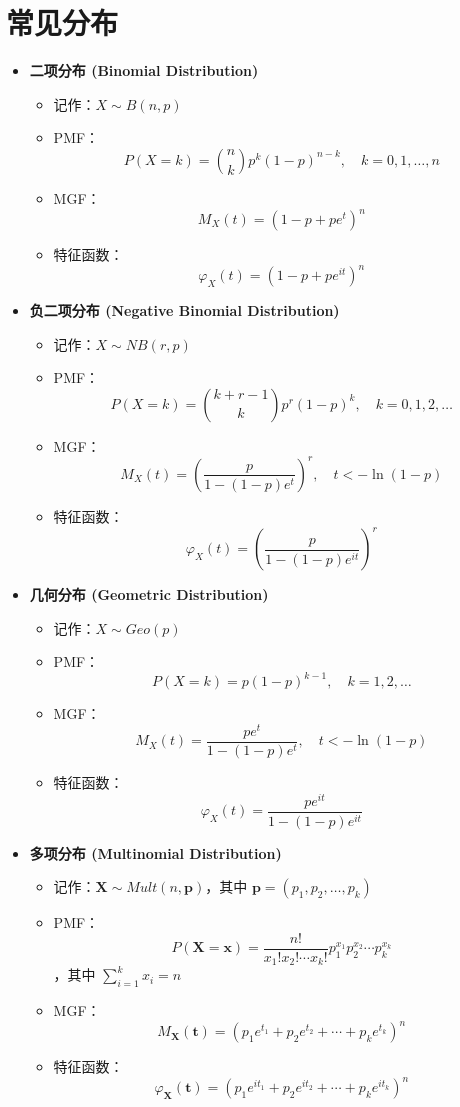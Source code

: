 \section{常见分布}

\begin{itemize}
    \item \textbf{二项分布 (Binomial Distribution)}
    \begin{itemize}
        \item 记作：$X \sim B(n, p)$
        \item PMF：$$P(X = k) = \binom{n}{k} p^k (1-p)^{n-k}, \quad k = 0, 1, \ldots, n$$
        \item MGF：$$M_X(t) = (1-p+pe^t)^n$$
        \item 特征函数：$$\varphi_X(t) = (1-p+pe^{it})^n$$
    \end{itemize}

    \item \textbf{负二项分布 (Negative Binomial Distribution)}
    \begin{itemize}
        \item 记作：$X \sim NB(r, p)$
        \item PMF：$$P(X = k) = \binom{k+r-1}{k} p^r (1-p)^k, \quad k = 0, 1, 2, \ldots$$
        \item MGF：$$M_X(t) = \left(\frac{p}{1-(1-p)e^t}\right)^r, \quad t < -\ln(1-p)$$
        \item 特征函数：$$\varphi_X(t) = \left(\frac{p}{1-(1-p)e^{it}}\right)^r$$
    \end{itemize}

    \item \textbf{几何分布 (Geometric Distribution)}
    \begin{itemize}
        \item 记作：$X \sim Geo(p)$
        \item PMF：$$P(X = k) = p(1-p)^{k-1}, \quad k = 1, 2, \ldots$$
        \item MGF：$$M_X(t) = \frac{pe^t}{1-(1-p)e^t}, \quad t < -\ln(1-p)$$
        \item 特征函数：$$\varphi_X(t) = \frac{pe^{it}}{1-(1-p)e^{it}}$$
    \end{itemize}

    \item \textbf{多项分布 (Multinomial Distribution)}
    \begin{itemize}
        \item 记作：$\mathbf{X} \sim Mult(n, \mathbf{p})$，其中 $\mathbf{p} = (p_1, p_2, \ldots, p_k)$
        \item PMF：$$P(\mathbf{X} = \mathbf{x}) = \frac{n!}{x_1! x_2! \cdots x_k!} p_1^{x_1} p_2^{x_2} \cdots p_k^{x_k}$$，其中 $\sum_{i=1}^k x_i = n$
        \item MGF：$$M_{\mathbf{X}}(\mathbf{t}) = (p_1 e^{t_1} + p_2 e^{t_2} + \cdots + p_k e^{t_k})^n$$
        \item 特征函数：$$\varphi_{\mathbf{X}}(\mathbf{t}) = (p_1 e^{it_1} + p_2 e^{it_2} + \cdots + p_k e^{it_k})^n$$
    \end{itemize}


\end{itemize}
